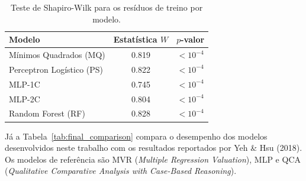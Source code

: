 \begin{table}[h!]

\centering

\caption{Teste de Shapiro-Wilk para os resíduos de treino por modelo.}

\label{tab:shapiro_summary}

\begin{tabular}{@{}lcc@{}}

\toprule

\textbf{Modelo} & \textbf{Estatística $W$} & \textbf{$p$-valor} \\

\midrule

Mínimos Quadrados (MQ) & 0.819 & $< 10^{-4}$ \\

Perceptron Logístico (PS) & 0.822 & $< 10^{-4}$ \\

MLP-1C & 0.745 & $< 10^{-4}$ \\

MLP-2C & 0.804 & $< 10^{-4}$ \\

Random Forest (RF) & 0.828 & $< 10^{-4}$ \\

\bottomrule

\end{tabular}

\end{table}


Já a Tabela~\ref{tab:final_comparison} compara o desempenho dos modelos desenvolvidos neste trabalho com os resultados reportados por Yeh \& Hsu (2018). Os modelos de referência são MVR (\textit{Multiple Regression Valuation}), MLP e QCA (\textit{Qualitative Comparative Analysis with Case-Based Reasoning}).



